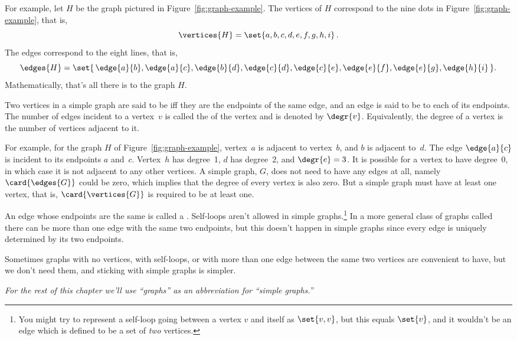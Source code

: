 For example, let $H$ be the graph pictured in
Figure~\ref{fig:graph-example}.  The vertices of $H$ correspond to the
nine dots in Figure~\ref{fig:graph-example}, that is,
\[
\vertices{H} =  \set{a, b, c, d, e, f, g, h, i}\, .
\]
The edges correspond to the eight lines, that is,
\[
\edges{H} =  \set{\, \edge{a}{b}, \edge{a}{c}, \edge{b}{d}, \edge{c}{d},
              \edge{c}{e}, \edge{e}{f}, \edge{e}{g}, \edge{h}{i} \,}.
\]
Mathematically, that's all there is to the graph $H$.

\begin{definition}
Two vertices in a simple graph are said to be  iff they
are the endpoints of the same edge, and an edge is said to be
 to each of its endpoints.  The number of edges
incident to a vertex~$v$ is called the  of the vertex and
is denoted by $\degr{v}$.  Equivalently, the degree of a vertex is the
number of vertices adjacent to it.
\end{definition}

For example, for the graph $H$ of Figure~\ref{fig:graph-example},
vertex~$a$ is adjacent to vertex~$b$, and $b$ is adjacent to~$d$.  The
edge $\edge{a}{c}$ is incident to its endpoints $a$ and~$c$.  Vertex~$h$
has degree~1, $d$ has degree~2, and $\degr{e} = 3$.  It is possible
for a vertex to have degree~0, in which case it is not adjacent to any
other vertices.  A simple graph, $G$, does not need to have any edges
at all, namely $\card{\edges{G}}$ could be zero, which implies
that the degree of every vertex is also zero.  But a simple graph must
have at least one vertex, that is, $\card{\vertices{G}}$ is required
to be at least one.

An edge whose endpoints are the same is called a .
Self-loops aren't allowed in simple graphs.\footnote{You might try to
  represent a self-loop going between a vertex $v$ and itself as
  $\set{v, v}$, but this equals $\set{v}$, and it wouldn't be an edge
  which is defined to be a set of \emph{two} vertices.}  In a more
general class of graphs called  there can be more
than one edge with the same two endpoints, but this doesn't happen in
simple graphs since every edge is uniquely determined by its two
endpoints.

Sometimes graphs with no vertices, with self-loops, or with more than one
edge between the same two vertices are convenient to have, but we don't
need them, and sticking with simple graphs is simpler. \smiley

\emph{For the rest of this chapter we'll use ``graphs'' as an abbreviation
  for ``simple graphs.''}

